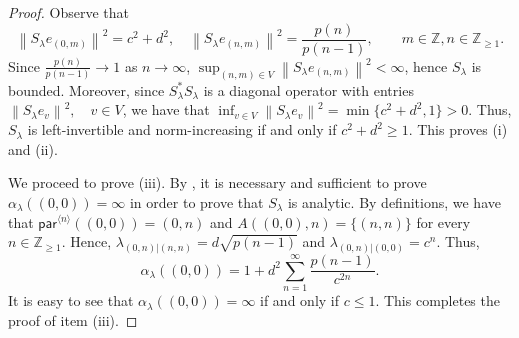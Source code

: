 \documentclass[11pt, reqno, a4paper]{amsart}
\theoremstyle{definition}
\newcommand{\norm}[1]{\left\lVert #1 \right\rVert}
\renewcommand{\ge}{\geqslant}
\renewcommand{\leq}{\leqslant}
\renewcommand{\geq}{\geqslant}
\newcommand{\Z}{\mathbb Z}
\newcommand{\pr}{\mathsf{par}}
\numberwithin{equation}{section}
\begin{document}
    \begin{proof}
        Observe that 
        \begin{equation*}
            \norm{S_{\lambda} e_{(0,m)}}^{2} = c^2 +d ^2, \quad \norm{S_{\lambda} e_{(n,m)}} ^{2} = \frac{p(n)}{p(n-1)}, \qquad m \in \Z, n \in \Z_{\ge 1}.
        \end{equation*}
        Since $\frac{p(n)}{p(n-1)} \to 1$ as $n \to \infty$, $\sup_{(n,m) \in V} \norm{S_{\lambda} e_{(n,m)}}^2 < \infty$, hence $S_{\lambda}$ is bounded. Moreover, since $S_{\lambda} ^{*} S_{\lambda}$ is a diagonal operator with entries $\norm{S_{\lambda} e_{v}}^{2}, \quad v \in V$, we have that $\inf_{v \in V} \norm{S_{\lambda} e_v}^{2} = \min \{ c^2 + d^2, 1\} > 0$. Thus, $S_{\lambda}$ is left-invertible and norm-increasing if and only if $c^2 + d^2 \ge 1$. This proves {\rm (i)} and {\rm (ii)}.

        We proceed to prove {\rm (iii)}. By , it is necessary and sufficient to prove $\alpha_{\lambda} ((0,0)) = \infty$ in order to prove that $S_{\lambda}$ is analytic. By definitions, we have that $\pr ^{\langle n\rangle}((0,0))=(0,n)$ and $A((0,0),n)=\{(n,n)\}$ for every $n\in\mathbb Z_{\geq 1}$. Hence, $\lambda_{(0,n)|(n,n)}=d\sqrt{p(n-1)}$ and $\lambda_{(0,n)|(0,0)}=c^n$. Thus,
        \begin{equation*}
            \alpha_\lambda((0,0))=1+d^2\sum_{n=1}^{\infty}\frac{p(n-1)}{c^{2n}}.
        \end{equation*}
        It is easy to see that $\alpha_\lambda((0,0))=\infty$ if and only if $c\leq 1$. This completes the proof of item {\rm (iii)}.


\end{proof}
\end{document}
